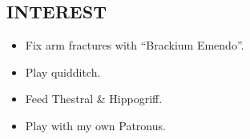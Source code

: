 \documentclass{danwyk_resume}[2022/01/23]
\begin{document}
\begin{spacing}{0.5}
\section{INTEREST}
    \begin{itemize}
    \setlength{\itemsep}{0pt}
    \setlength{\parsep}{10pt}
    \setlength{\parskip}{5pt}
        \item Fix arm fractures with “Brackium Emendo”.
        \item Play quidditch. 
        \item Feed Thestral \& Hippogriff.
        \item Play with my own Patronus.
    \end{itemize}

\end{spacing}
\end{document}
